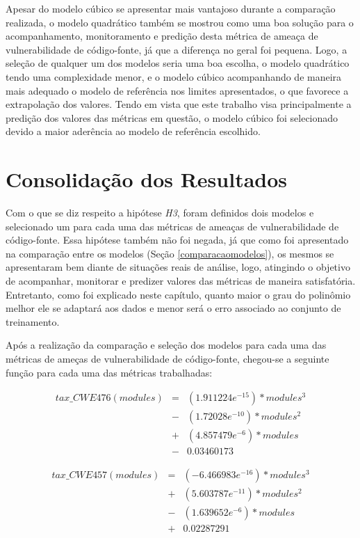 Apesar do modelo cúbico se apresentar mais vantajoso durante a comparação
realizada, o modelo quadrático também se mostrou como uma boa solução para o
acompanhamento, monitoramento e predição desta métrica de ameaça de
vulnerabilidade de código-fonte, já que a diferença no geral foi pequena. Logo,
a seleção de qualquer um dos modelos seria uma boa escolha, o modelo quadrático
tendo uma complexidade menor, e o modelo cúbico acompanhando de maneira
mais adequado o modelo de referência nos limites apresentados, o que favorece a
extrapolação dos valores. Tendo em vista que este trabalho visa principalmente
a predição dos valores das métricas em questão, o modelo cúbico foi selecionado
devido a maior aderência ao modelo de referência escolhido.


\section{Consolidação dos Resultados}\label{consolidacaoresultados}

Com o que se diz respeito a hipótese \textit{H3}, foram definidos dois modelos e
selecionado um para cada uma das métricas de ameaças de vulnerabilidade de
código-fonte. Essa hipótese também não foi negada, já que como foi apresentado
na comparação entre os modelos (Seção \ref{comparacaomodelos}), os mesmos se
apresentaram bem diante de situações reais de análise, logo, atingindo o
objetivo de acompanhar, monitorar e predizer valores das métricas de maneira
satisfatória. Entretanto, como foi explicado neste capítulo, quanto maior o grau
do polinômio melhor ele se adaptará aos dados e menor será o erro associado ao
conjunto de treinamento.

Após a realização da comparação e seleção dos modelos para cada uma das métricas
de ameças de vulnerabilidade de código-fonte, chegou-se a seguinte função para
cada uma das métricas trabalhadas:

\begin{align*}
 tax\_CWE476(modules) &=& (1.911224e^{-15}) * modules^{3} \\
                      &-& (1.72028e^{-10}) * modules^{2} \\
                      &+& (4.857479e^{-6}) * modules \\
                      &-& 0.03460173
\end{align*}

\begin{align*}
 tax\_CWE457(modules) &=& (-6.466983e^{-16}) * modules^{3} \\
                      &+& (5.603787e^{-11}) * modules^{2} \\
                      &-& (1.639652e^{-6}) * modules \\
                      &+& 0.02287291
\end{align*}

